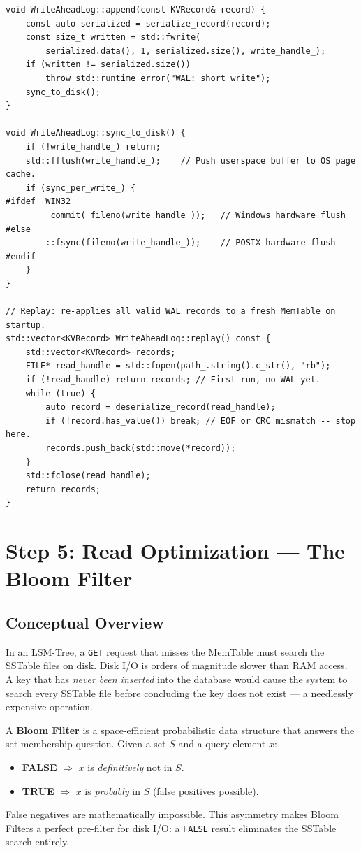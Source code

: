 \documentclass[11pt,a4paper]{article}
\begin{document}
\begin{lstlisting}[style=cpp, caption={WAL Append and Platform Sync: \texttt{src/wal.cpp}}]
void WriteAheadLog::append(const KVRecord& record) {
    const auto serialized = serialize_record(record);
    const size_t written = std::fwrite(
        serialized.data(), 1, serialized.size(), write_handle_);
    if (written != serialized.size())
        throw std::runtime_error("WAL: short write");
    sync_to_disk();
}

void WriteAheadLog::sync_to_disk() {
    if (!write_handle_) return;
    std::fflush(write_handle_);    // Push userspace buffer to OS page cache.
    if (sync_per_write_) {
#ifdef _WIN32
        _commit(_fileno(write_handle_));   // Windows hardware flush
#else
        ::fsync(fileno(write_handle_));    // POSIX hardware flush
#endif
    }
}

// Replay: re-applies all valid WAL records to a fresh MemTable on startup.
std::vector<KVRecord> WriteAheadLog::replay() const {
    std::vector<KVRecord> records;
    FILE* read_handle = std::fopen(path_.string().c_str(), "rb");
    if (!read_handle) return records; // First run, no WAL yet.
    while (true) {
        auto record = deserialize_record(read_handle);
        if (!record.has_value()) break; // EOF or CRC mismatch -- stop here.
        records.push_back(std::move(*record));
    }
    std::fclose(read_handle);
    return records;
}
\end{lstlisting}

\section{Step 5: Read Optimization --- The Bloom Filter}
\label{sec:bloom}

\subsection{Conceptual Overview}

In an LSM-Tree, a \texttt{GET} request that misses the MemTable must search
the SSTable files on disk. Disk I/O is orders of magnitude slower than RAM
access. A key that has \emph{never been inserted} into the database would
cause the system to search every SSTable file before concluding the key does
not exist --- a needlessly expensive operation.

A \textbf{Bloom Filter} is a space-efficient probabilistic data structure that
answers the set membership question. Given a set $S$ and a query element $x$:
\begin{itemize}[noitemsep]
    \item \textbf{FALSE} $\Rightarrow$ $x$ is \emph{definitively} not in $S$.
    \item \textbf{TRUE} $\Rightarrow$ $x$ is \emph{probably} in $S$ (false positives possible).
\end{itemize}
False negatives are mathematically impossible. This asymmetry makes Bloom
Filters a perfect pre-filter for disk I/O: a \texttt{FALSE} result
eliminates the SSTable search entirely.
\end{document}

